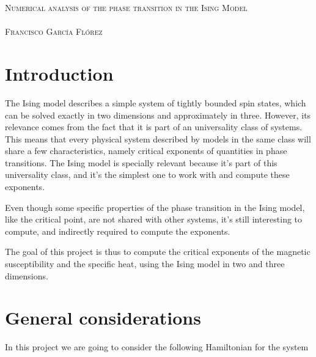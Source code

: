 \documentclass[8 pt, twocolumn]{article}
\begin{document}

\begin{minipage}[b]{\linewidth}
  \centering
  \Large \textsc{Numerical analysis of the phase transition in the Ising Model}\\
  ~\\
  \large \textsc{Francisco García Flórez}
\end{minipage}

\section{Introduction}


The Ising model describes a simple system of tightly bounded spin states, which can be solved exactly in two dimensions and approximately in three. However, its relevance comes from the fact that it is part of an universality class of systems. This means that every physical system described by models in the same class will share a few characteristics, namely critical exponents of quantities in phase transitions. The Ising model is specially relevant because it's part of this universality class, and it's the simplest one to work with and compute these exponents.

Even though some specific properties of the phase transition in the Ising model, like the critical point, are not shared with other systems, it's still interesting to compute, and indirectly required to compute the exponents.

The goal of this project is thus to compute the critical exponents of the magnetic susceptibility and the specific heat, using the Ising model in two and three dimensions.

\section{General considerations}

In this project we are going to consider the following Hamiltonian for the system
\end{document}
